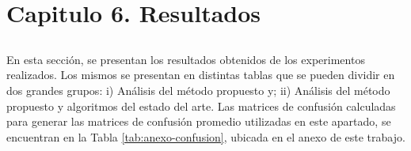 \chapter*{Capitulo 6. \textbf{Resultados}}\label{ch:resultados}

\section*{}
\addtocounter{section}{1}
\setcounter{subsection}{0}

En esta sección, se presentan los resultados obtenidos de los experimentos realizados. Los mismos se presentan en distintas tablas que se pueden dividir en dos grandes grupos: i) Análisis del método propuesto y; ii) Análisis del método propuesto y algoritmos del estado del arte. Las matrices de confusión calculadas para generar las matrices de confusión promedio utilizadas en este apartado, se encuentran en la Tabla \ref{tab:anexo-confusion}, ubicada en el anexo de este trabajo.






